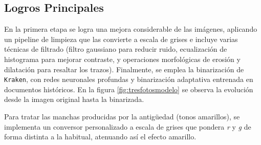 \documentclass[11pt,a4paper]{article}
\begin{document}
\subsection{Logros Principales}

En la primera etapa se logra una mejora considerable de las imágenes, aplicando un pipeline de limpieza que las convierte a escala de grises e incluye varias técnicas de filtrado (filtro gaussiano para reducir ruido, ecualización de histograma para mejorar contraste, y operaciones morfológicas de erosión y dilatación para resaltar los trazos). Finalmente, se emplea la binarización de \texttt{Kraken}, con redes neuronales profundas y binarización adaptativa entrenada en documentos históricos. En la figura \ref{fig:tresfotosmodelo} se observa la evolución desde la imagen original hasta la binarizada.

Para tratar las manchas producidas por la antigüedad (tonos amarillos), se implementa un conversor personalizado a escala de grises que pondera \textit{r} y \textit{g} de forma distinta a la habitual, atenuando así el efecto amarillo.
\end{document}
